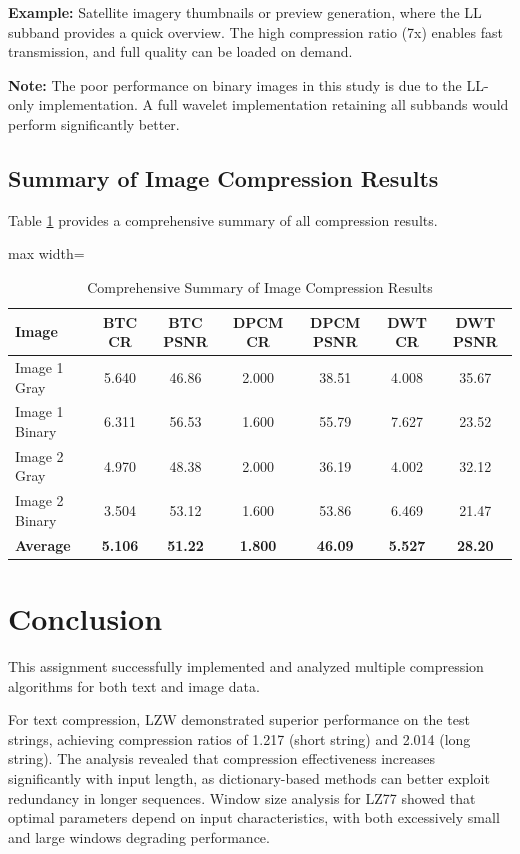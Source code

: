 \documentclass[12pt, a4paper]{AnantDocumentation}
\begin{document}
\textbf{Example:} Satellite imagery thumbnails or preview generation, where the LL subband provides a quick overview. The high compression ratio (7x) enables fast transmission, and full quality can be loaded on demand.

\textbf{Note:} The poor performance on binary images in this study is due to the LL-only implementation. A full wavelet implementation retaining all subbands would perform significantly better.

\subsection{Summary of Image Compression Results}
\label{subsec:image-compression-summary}
Table \ref{tab:image-compression-summary} provides a comprehensive summary of all compression results.

\begin{table}[h!]
	\centering
	\small
	\begin{adjustbox}{max width=\textwidth}
	\begin{tabular}{lcccccc}
		\toprule
		\textbf{Image} & \textbf{BTC CR} & \textbf{BTC PSNR} & \textbf{DPCM CR} & \textbf{DPCM PSNR} & \textbf{DWT CR} & \textbf{DWT PSNR} \\
		\midrule
		Image 1 Gray & 5.640 & 46.86 & 2.000 & 38.51 & 4.008 & 35.67 \\
		Image 1 Binary & 6.311 & 56.53 & 1.600 & 55.79 & 7.627 & 23.52 \\
		Image 2 Gray & 4.970 & 48.38 & 2.000 & 36.19 & 4.002 & 32.12 \\
		Image 2 Binary & 3.504 & 53.12 & 1.600 & 53.86 & 6.469 & 21.47 \\
		\midrule
		\textbf{Average} & \textbf{5.106} & \textbf{51.22} & \textbf{1.800} & \textbf{46.09} & \textbf{5.527} & \textbf{28.20} \\
		\bottomrule
	\end{tabular}
	\end{adjustbox}
	\caption{Comprehensive Summary of Image Compression Results}
	\label{tab:image-compression-summary}
\end{table}

\section{Conclusion}
\label{sec:conclusion}
This assignment successfully implemented and analyzed multiple compression algorithms for both text and image data.

For text compression, LZW demonstrated superior performance on the test strings, achieving compression ratios of 1.217 (short string) and 2.014 (long string). The analysis revealed that compression effectiveness increases significantly with input length, as dictionary-based methods can better exploit redundancy in longer sequences. Window size analysis for LZ77 showed that optimal parameters depend on input characteristics, with both excessively small and large windows degrading performance.
\end{document}
